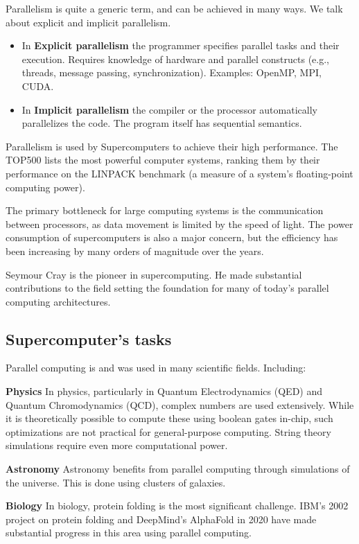 \documentclass[a4paper]{tufte-handout} %
\begin{document}
Parallelism is quite a generic term, and can be achieved in many ways. We talk about explicit and implicit parallelism.

\begin{itemize}
	\item In \textbf{Explicit parallelism} the programmer specifies parallel tasks and their execution. Requires knowledge of hardware and parallel constructs (e.g., threads, message passing, synchronization). Examples: OpenMP, MPI, CUDA.
	\item In \textbf{Implicit parallelism} the compiler or the processor automatically parallelizes the code. The program itself has sequential semantics.
\end{itemize}

Parallelism is used by Supercomputers to achieve their high performance. The TOP500\cite{top500} lists the most powerful computer systems, ranking them by their performance on the LINPACK benchmark (a measure of a system's floating-point computing power). 

The primary bottleneck for large computing systems is the communication between processors, as data movement is limited by the speed of light. The power consumption of supercomputers is also a major concern, but the efficiency has been increasing by many orders of magnitude over the years.

Seymour Cray is the pioneer in supercomputing. He made substantial contributions to the field\cite{crey_seymour} setting the foundation for many of today's parallel computing architectures. 

\subsection{Supercomputer's tasks}

Parallel computing is and was used in many scientific fields. Including:

\textbf{Physics}
In physics, particularly in Quantum Electrodynamics (QED) and Quantum Chromodynamics (QCD), complex numbers are used extensively. While it is theoretically possible to compute these using boolean gates in-chip, such optimizations are not practical for general-purpose computing. String theory simulations require even more computational power.

\textbf{Astronomy}
Astronomy benefits from parallel computing through simulations of the universe. This is done using clusters of galaxies.

\textbf{Biology}
In biology, protein folding is the most significant challenge. IBM's 2002 project on protein folding\cite{ibm_protein_folding} and DeepMind's AlphaFold in 2020\cite{alphafold} have made substantial progress in this area using parallel computing.
\end{document}

